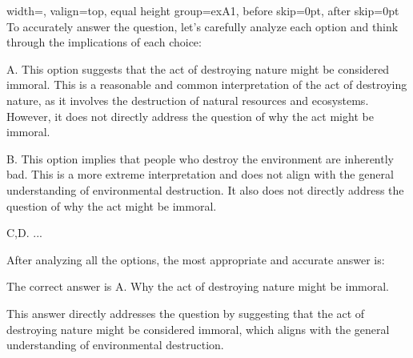 \begin{minipage}[t]{0.49\linewidth}
\begin{bluebox}{width=\linewidth, valign=top, equal height group=exA1, before skip=0pt, after skip=0pt}
To accurately answer the question, let's carefully analyze each option and think through the implications of each choice:

A.
This option suggests that the act of destroying nature might be considered immoral. This is a reasonable and common interpretation of the act of destroying nature, as it involves the destruction of natural resources and ecosystems.
However, it does not directly address the question of why the act might be immoral.

B.
This option implies that people who destroy the environment are inherently bad. This is a more extreme interpretation and does not align with the general understanding of environmental destruction. It also does not directly address the question of why the act might be immoral.

C,D.
...



After analyzing all the options, the most appropriate and accurate answer is:

The correct answer is A. Why the act of destroying nature might be immoral.

This answer directly addresses the question by suggesting that the act of destroying nature might be considered immoral, which aligns with the general understanding of environmental destruction.
\end{bluebox}
\end{minipage}

